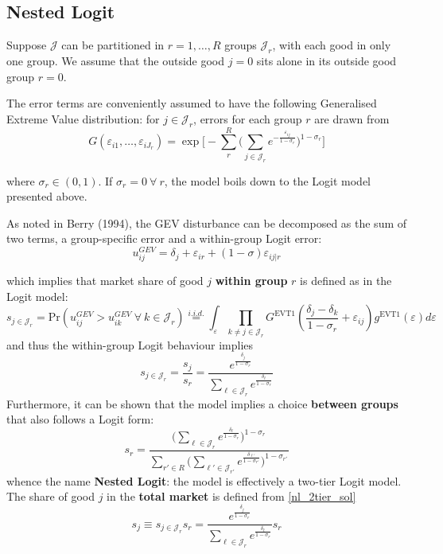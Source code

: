 \documentclass[11pt]{article}
\begin{document}
\subsection{Nested Logit}

Suppose $\mathscr{J}$ can be partitioned in $r = 1, \dots, R$ groups $\mathscr{J}_r$, with each good in only one group.
We assume that the outside good $j = 0 $ sits alone in its outside good group $r = 0$.

The error terms are conveniently assumed to have the following Generalised Extreme Value distribution: for $j \in \mathscr{J}_r$, errors for each group $r$ are drawn from
\begin{equation}
	G(\varepsilon_{i1}, \dots, \varepsilon_{iJ_r}) = \exp \bigg[ - \sum_r^R \big( \sum_{j \in \mathscr{J}_r} e^{- \frac{\varepsilon_{ij}}{1 - \sigma_r}} \big)^{1 - \sigma_r} \bigg]
\end{equation}

where $\sigma_r \in (0,1)$. If $\sigma_r = 0 ~\forall~ r$, the model boils down to the Logit model presented above.

As noted in Berry (1994), the GEV disturbance can be decomposed as the sum of two terms, a group-specific error and a within-group Logit error:
\begin{equation}
	u^{GEV}_{ij} = \delta_j + \varepsilon_{ir} + (1 - \sigma) \varepsilon_{ij | r}
\end{equation}

which implies that market share of good $j$ \textbf{within group} $r$ is defined as in the Logit model:
\begin{equation}
	\label{nl_2tier}
	s_{j \in \mathscr{J}_r} = \text{Pr}(u^{GEV}_{ij} > u^{GEV}_{ik} ~\forall~ k \in \mathscr{J}_r) \overset{i.i.d.}{=} \int_\varepsilon \prod_{k \neq j \in \mathscr{J}_r} G^{\text{EVT1}}(\frac{\delta_j - \delta_k}{1- \sigma_r} + \varepsilon_{ij}) g^{\text{EVT1}}(\varepsilon) d\varepsilon
\end{equation}
and thus the within-group Logit behaviour implies
\vspace{-.25cm}
\begin{equation}
 \label{nl_2tier_sol}
	s_{j \in \mathscr{J}_r} = \frac{s_j}{s_r} = \frac{e^{\frac{\delta_j}{1 - \sigma_r}}}{\sum_{\ell \in \mathscr{J}_r}e^{\frac{\delta_\ell}{1 - \sigma_r}}}
\end{equation}
Furthermore, it can be shown that the model implies a choice \textbf{between groups} that also follows a Logit form:
\begin{equation}
	s_r = \frac{\big(\sum_{\ell \in \mathscr{J}_r}e^{\frac{\delta_\ell}{1 - \sigma_r}}\big)^{1 - \sigma_r}}{\sum_{r' \in R}\big(\sum_{\ell' \in \mathscr{J}_{r'}}e^{\frac{\delta_{\ell'}}{1 - \sigma_{r'}}}\big)^{1 - \sigma_{r'}}}
\end{equation}
whence the name \textbf{Nested Logit}: the model is effectively a two-tier Logit model.
The share of good $j$ in the \textbf{total market} is defined from \eqref{nl_2tier_sol}
\begin{equation}
	\label{nl_s}
	s_j \equiv s_{j \in \mathscr{J}_r}s_r = \frac{e^{\frac{\delta_j}{1 - \sigma_r}}}{\sum_{\ell \in \mathscr{J}_r}e^{\frac{\delta_\ell}{1 - \sigma_r}}}s_r
\end{equation}
\end{document}
